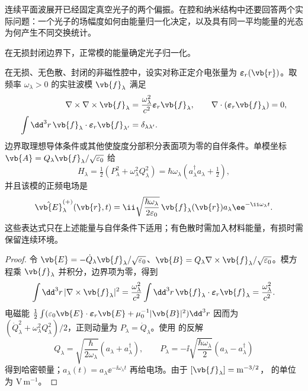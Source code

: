 连续平面波展开已经固定真空光子的两个偏振。在腔和纳米结构中还要回答两个实际问题：一个光子的场幅度如何由能量归一化决定，以及具有同一平均能量的光态为何产生不同交换统计。

在无损封闭边界下，正常模的能量确定光子归一化。
\label{sec:feqo-quantized-field}
\begin{proposition}[无损正常模的每光子归一化]
在无损、无色散、封闭的非磁性腔中，设实对称正定介电张量为 $\boldsymbol\varepsilon_r(\vb{r})$。取频率 $\omega_\lambda>0$ 的实驻波模 $\vb{f}_\lambda$ 满足
\begin{align}
 \nabla\times\nabla\times\vb{f}_\lambda
 &=\frac{\omega_\lambda^2}{c^2}\boldsymbol\varepsilon_r\vb{f}_\lambda,
 \qquad \nabla\cdot(\boldsymbol\varepsilon_r\vb{f}_\lambda)=0,\nonumber\\
 \int\dd^3r\,\vb{f}_\lambda\cdot\boldsymbol\varepsilon_r\vb{f}_{\lambda'}
 &=\delta_{\lambda\lambda'}.
 \label{eq:feqo-normal-mode-energy-normalization}
\end{align}
边界取理想导体条件或其他使旋度分部积分表面项为零的自伴条件。单模坐标 $\vb{A}=Q_\lambda\vb{f}_\lambda/\sqrt{\varepsilon_0}$ 给
\begin{equation}
 H_\lambda=\tfrac12(P_\lambda^2+\omega_\lambda^2Q_\lambda^2)
 =\hbar\omega_\lambda(a_\lambda^\dagger a_\lambda+\tfrac12),
 \label{eq:feqo-single-mode-hamiltonian}
\end{equation}
并且该模的正频电场是
\begin{equation}
 \hat{\vb{E}}^{(+)}_\lambda(\vb{r},t)
 =\ii\sqrt{\frac{\hbar\omega_\lambda}{2\varepsilon_0}}\,
 \vb{f}_\lambda(\vb{r})a_\lambda\ee^{-\ii\omega_\lambda t}.
 \label{eq:feqo-single-mode-field}
\end{equation}
这些表达式只在上述能量与自伴条件下适用；有色散时需加入材料能量，有损时需保留连续环境。
\end{proposition}

\begin{proof}
令 $\vb{E}=-\dot Q_\lambda\vb{f}_\lambda/\sqrt{\varepsilon_0}$、$\vb{B}=Q_\lambda\nabla\times\vb{f}_\lambda/\sqrt{\varepsilon_0}$。模方程乘 $\vb{f}_\lambda$ 并积分，边界项为零，得到
\begin{equation*}
 \int\dd^3r\,|\nabla\times\vb{f}_\lambda|^2
 =\frac{\omega_\lambda^2}{c^2}
 \int\dd^3r\,\vb{f}_\lambda\cdot\boldsymbol\varepsilon_r\vb{f}_\lambda
 =\frac{\omega_\lambda^2}{c^2}.
\end{equation*}
电磁能 $\frac12\int(\varepsilon_0\vb{E}\cdot\boldsymbol\varepsilon_r\vb{E}+\mu_0^{-1}|\vb{B}|^2)\dd^3r$ 因而为 $(\dot Q_\lambda^2+\omega_\lambda^2Q_\lambda^2)/2$，正则动量为 $P_\lambda=\dot Q_\lambda$。使用 的反解
\begin{equation*}
 Q_\lambda=\sqrt{\frac{\hbar}{2\omega_\lambda}}(a_\lambda+a_\lambda^\dagger),
 \qquad P_\lambda=-\ii\sqrt{\frac{\hbar\omega_\lambda}{2}}(a_\lambda-a_\lambda^\dagger)
\end{equation*}
得到哈密顿量；$a_\lambda(t)=a_\lambda\ee^{-\ii\omega_\lambda t}$ 再给电场。由于 $[\vb{f}_\lambda]=\mathrm{m^{-3/2}}$， 的单位为 $\mathrm{V\,m^{-1}}$。
\end{proof}

